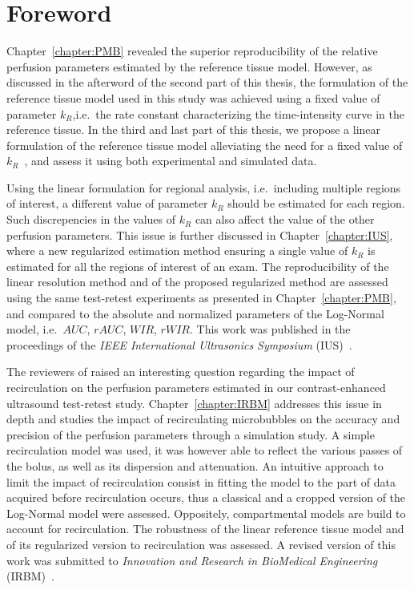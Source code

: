 \chapter*{Foreword}
Chapter~\ref{chapter:PMB} revealed the superior reproducibility of the relative perfusion parameters estimated by the reference tissue model.
However, as discussed in the afterword of the second part of this thesis, the formulation of the reference tissue model used in this study was achieved using a fixed value of parameter $k_R$,i.e.~the rate constant characterizing the time-intensity curve in the reference tissue.
In the third and last part of this thesis, we propose a linear formulation of the reference tissue model alleviating the need for a fixed value of $k_R$~\cite{CardenasRodriguez:2013em}, and assess it using both experimental and simulated data.

Using the linear formulation for regional analysis, i.e.~including multiple regions of interest, a different value of parameter $k_R$ should be estimated for each region.
Such discrepencies in the values of $k_R$ can also affect the value of the other perfusion parameters.
This issue is further discussed in Chapter~\ref{chapter:IUS}, where a new regularized estimation method ensuring a single value of $k_R$ is estimated for all the regions of interest of an exam.
The reproducibility of the linear resolution method and of the proposed regularized method are assessed using the same test-retest experiments as presented in Chapter~\ref{chapter:PMB}, and compared to the absolute and normalized parameters of the Log-Normal model, i.e.~$AUC$, $rAUC$, $WIR$, $rWIR$.
This work was published in the proceedings of the {\em IEEE International Ultrasonics Symposium} (IUS)~\cite{Doury:2016fi}.

The reviewers of \cite{Doury:2016fi} raised an interesting question regarding the impact of recirculation on the perfusion parameters estimated in our contrast-enhanced ultrasound test-retest study.
Chapter~\ref{chapter:IRBM} addresses this issue in depth and studies the impact of recirculating microbubbles on the accuracy and precision of the perfusion parameters through a simulation study.
A simple recirculation model was used, it was however able to reflect the various passes of the bolus, as well as its dispersion and attenuation.
An intuitive approach to limit the impact of recirculation consist in fitting the model to the part of data acquired before recirculation occurs, thus a classical and a cropped version of the Log-Normal model were assessed.
Oppositely, compartmental models are build to account for recirculation.
The robustness of the linear reference tissue model and of its regularized version to recirculation was assessed.
A revised version of this work was submitted to {\em Innovation and Research in BioMedical Engineering} (IRBM)~\cite{Doury:2017vv}.

